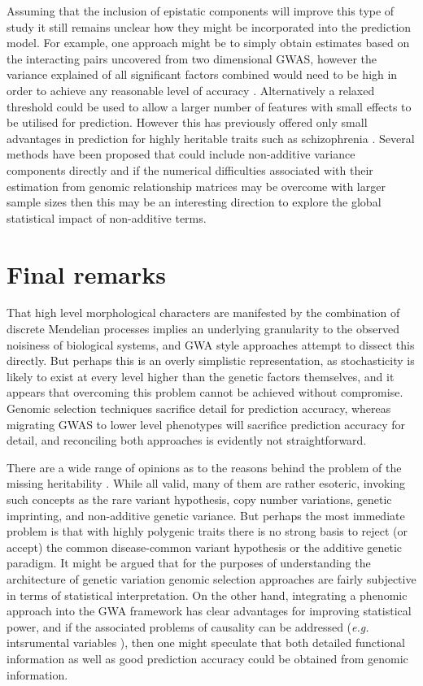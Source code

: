 Assuming that the inclusion of epistatic components will improve this type of study it still remains unclear how they might be incorporated into the prediction model. For example, one approach might be to simply obtain estimates based on the interacting pairs uncovered from two dimensional GWAS, however the variance explained of all significant factors combined would need to be high in order to achieve any reasonable level of accuracy \citep{Wray2007, Evans2009}. Alternatively a relaxed threshold could be used to allow a larger number of features with small effects to be utilised for prediction. However this has previously offered only small advantages in prediction for highly heritable traits such as schizophrenia \citep{Purcell2009}. Several methods have been proposed that could include non-additive variance components directly \citep{Gianola2006, Gianola2009, deLosCampos2009} and if the numerical difficulties associated with their estimation from genomic relationship matrices may be overcome with larger sample sizes then this may be an interesting direction to explore the global statistical impact of non-additive terms.


\section{Final remarks}

That high level morphological characters are manifested by the combination of discrete Mendelian processes implies an underlying granularity to the observed noisiness of biological systems, and GWA style approaches attempt to dissect this directly. But perhaps this is an overly simplistic representation, as stochasticity is likely to exist at every level higher than the genetic factors themselves, and it appears that overcoming this problem cannot be achieved without compromise. Genomic selection techniques sacrifice detail for prediction accuracy, whereas migrating GWAS to lower level phenotypes will sacrifice prediction accuracy for detail, and reconciling both approaches is evidently not straightforward.

There are a wide range of opinions as to the reasons behind the problem of the missing heritability \citep{Eichler2010}. While all valid, many of them are rather esoteric, invoking such concepts as the rare variant hypothesis, copy number variations, genetic imprinting, and non-additive genetic variance. But perhaps the most immediate problem is that with highly polygenic traits there is no strong basis to reject (or accept) the common disease-common variant hypothesis or the additive genetic paradigm. It might be argued that for the purposes of understanding the architecture of genetic variation genomic selection approaches are fairly subjective in terms of statistical interpretation. On the other hand, integrating a phenomic approach into the GWA framework has clear advantages for improving statistical power, and if the associated problems of causality can be addressed (\emph{e.g.} intsrumental variables \citet{McKeigue2010}), then one might speculate that both detailed functional information as well as good prediction accuracy could be obtained from genomic information.

